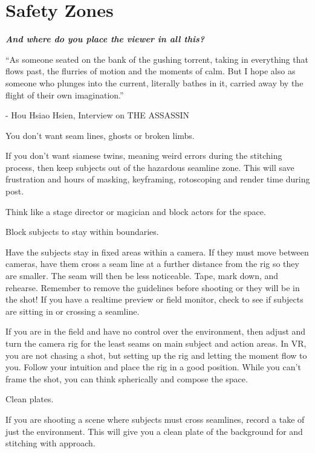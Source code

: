 \chapter{Safety Zones}
\pagecolor{white}
\label{chap:23}
\begin{fullwidth}


{\itshape\bfseries And where do you place the viewer in all this?

“As someone seated on the bank of the gushing torrent, taking in everything that flows past, the flurries of motion and the moments of calm. But I hope also as someone who plunges into the current, literally bathes in it, carried away by the flight of their own imagination.”}

- Hou Hsiao Hsien, Interview on THE ASSASSIN
\vspace{\baselineskip}

\problem

{\large You don’t want seam lines, ghosts or broken limbs. \par}

If you don’t want siamese twins, meaning weird errors during the stitching process, then keep subjects out of the hazardous seamline zone. This will save frustration and hours of masking, keyframing, rotoscoping and render time during post. 

Think like a stage director or magician and block actors for the space. 


\solution

{\large Block subjects to stay within boundaries. \par}

Have the subjects stay in fixed areas within a camera. If they must move between cameras, have them cross a seam line at a further distance from the rig so they are smaller. The seam will then be less noticeable. Tape, mark down, and rehearse. Remember to remove the guidelines before shooting or they will be in the shot! If you have a realtime preview or field monitor, check to see if subjects are sitting in or crossing a seamline. 
\clearpage
{}

If you are in the field and have no control over the environment, then adjust and turn the camera rig for the least seams on main subject and action areas. In VR, you are not chasing a shot, but setting up the rig and letting the moment flow to you. Follow your intuition and place the rig in a good position. While you can’t frame the shot, you can think spherically and compose the space. 

{\large Clean plates. \par}

If you are shooting a scene where subjects must cross seamlines, record a take of just the environment. This will give you a clean plate of the background for \textbf{} and stitching with \textbf{} approach. 


\clearpage
\end{fullwidth}
